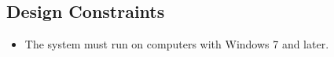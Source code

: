 \subsection {Design Constraints}
	\begin{itemize}
		\item The system must run on computers with Windows 7 and later.

		
	\end{itemize}